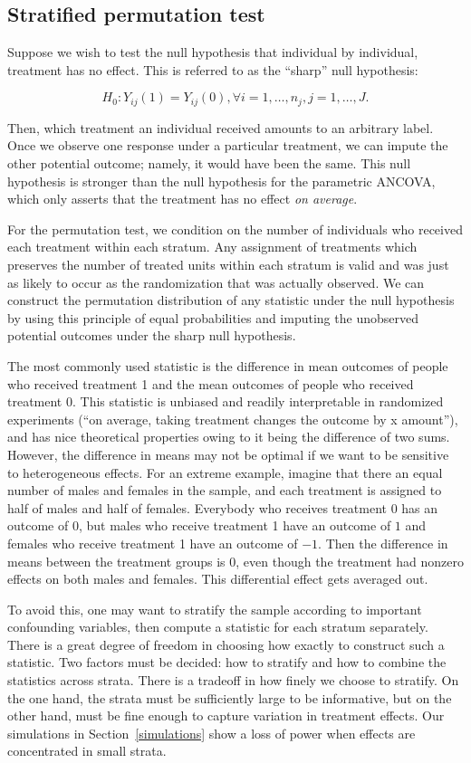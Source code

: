 \documentclass[11pt]{article}
\begin{document}
\subsection*{Stratified permutation test}
Suppose we wish to test the null hypothesis that individual by individual, treatment has no effect.
This is referred to as the ``sharp'' null hypothesis:

$$H_0: Y_{ij}(1) = Y_{ij}(0), \forall i = 1, \dots, n_j, j = 1,\dots, J.$$

Then, which treatment an individual received amounts to an arbitrary label.
Once we observe one response under a particular treatment, we can impute the other potential outcome; namely, it would have been the same.
This null hypothesis is stronger than the null hypothesis for the parametric ANCOVA, which only asserts that the treatment has no effect \textit{on average}.

For the permutation test, we condition on the number of individuals who received each treatment within each stratum.
Any assignment of treatments which preserves the number of treated units within each stratum is valid and was just as likely to occur as the randomization that was actually observed.
We can construct the permutation distribution of any statistic under the null hypothesis by using this principle of equal probabilities and imputing the unobserved potential outcomes under the sharp null hypothesis.

The most commonly used statistic is the difference in mean outcomes of people who received treatment 1 and the mean outcomes of people who received treatment 0.  
This statistic is unbiased and readily interpretable in randomized experiments (``on average, taking treatment changes the outcome by x amount''), and has nice theoretical properties owing to it being the difference of two sums.
However, the difference in means may not be optimal if we want to be sensitive to heterogeneous effects.  
For an extreme example, imagine that there an equal number of males and females in the sample, and each treatment is assigned to half of males and half of females.  
Everybody who receives treatment 0 has an outcome of 0, but males who receive treatment 1 have an outcome of $1$ and females who receive treatment 1 have an outcome of $-1$.  
Then the difference in means between the treatment groups is $0$, even though the treatment had nonzero effects on both males and females.  
This differential effect gets averaged out.

To avoid this, one may want to stratify the sample according to important confounding variables, then compute a statistic for each stratum separately. 
There is a great degree of freedom in choosing how exactly to construct such a statistic.
Two factors must be decided: how to stratify and how to combine the statistics across strata.
There is a tradeoff in how finely we choose to stratify.
On the one hand, the strata must be sufficiently large to be informative,
 but on the other hand, must be fine enough to capture variation in treatment effects.
Our simulations in Section~\ref{simulations} show a loss of power when effects are concentrated in small strata.
\end{document}
